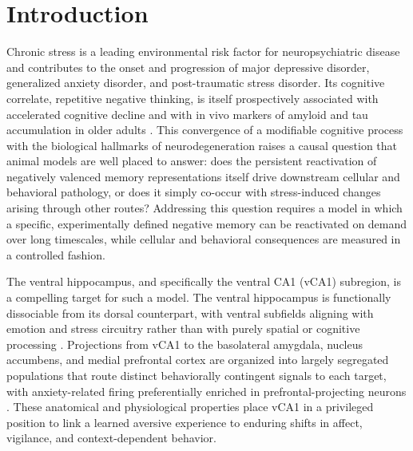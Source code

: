 \documentclass[11pt]{article}
\begin{document}
\section{Introduction}

Chronic stress is a leading environmental risk factor for neuropsychiatric disease and contributes to the onset and progression of major depressive disorder, generalized anxiety disorder, and post-traumatic stress disorder. Its cognitive correlate, repetitive negative thinking, is itself prospectively associated with accelerated cognitive decline and with in vivo markers of amyloid and tau accumulation in older adults \citep{marchant2020rnt}. This convergence of a modifiable cognitive process with the biological hallmarks of neurodegeneration raises a causal question that animal models are well placed to answer: does the persistent reactivation of negatively valenced memory representations itself drive downstream cellular and behavioral pathology, or does it simply co-occur with stress-induced changes arising through other routes? Addressing this question requires a model in which a specific, experimentally defined negative memory can be reactivated on demand over long timescales, while cellular and behavioral consequences are measured in a controlled fashion.

The ventral hippocampus, and specifically the ventral CA1 (vCA1) subregion, is a compelling target for such a model. The ventral hippocampus is functionally dissociable from its dorsal counterpart, with ventral subfields aligning with emotion and stress circuitry rather than with purely spatial or cognitive processing \citep{fanselow2010ventral}. Projections from vCA1 to the basolateral amygdala, nucleus accumbens, and medial prefrontal cortex are organized into largely segregated populations that route distinct behaviorally contingent signals to each target, with anxiety-related firing preferentially enriched in prefrontal-projecting neurons \citep{ciocchi2015vca1}. These anatomical and physiological properties place vCA1 in a privileged position to link a learned aversive experience to enduring shifts in affect, vigilance, and context-dependent behavior.
\end{document}
